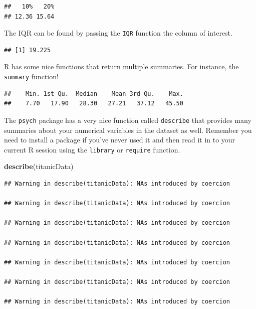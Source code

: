 \documentclass[
]{book}
\newenvironment{Shaded}{\begin{snugshade}}{\end{snugshade}}
\newcommand{\CommentTok}[1]{\textcolor[rgb]{0.56,0.35,0.01}{\textit{#1}}}
\newcommand{\KeywordTok}[1]{\textcolor[rgb]{0.13,0.29,0.53}{\textbf{#1}}}
\newcommand{\NormalTok}[1]{#1}
\newcommand{\OperatorTok}[1]{\textcolor[rgb]{0.81,0.36,0.00}{\textbf{#1}}}
\theoremstyle{definition}
\theoremstyle{definition}
\theoremstyle{definition}
\theoremstyle{remark}
\begin{document}
\begin{verbatim}
##   10%   20% 
## 12.36 15.64
\end{verbatim}

The IQR can be found by passing the \texttt{IQR} function the column of interest.

\begin{Shaded}
\end{Shaded}

\begin{verbatim}
## [1] 19.225
\end{verbatim}

R has some nice functions that return multiple summaries. For instance, the \texttt{summary} function!

\begin{Shaded}
\end{Shaded}

\begin{verbatim}
##    Min. 1st Qu.  Median    Mean 3rd Qu.    Max. 
##    7.70   17.90   28.30   27.21   37.12   45.50
\end{verbatim}

The \texttt{psych} package has a very nice function called \texttt{describe} that provides many summaries about your numerical variables in the dataset as well. Remember you need to install a package if you've never used it and then read it in to your current R session using the \texttt{library} or \texttt{require} function.

\begin{Shaded}
\begin{Highlighting}[]
\KeywordTok{describe}\NormalTok{(titanicData)}
\end{Highlighting}
\end{Shaded}

\begin{verbatim}
## Warning in describe(titanicData): NAs introduced by coercion

## Warning in describe(titanicData): NAs introduced by coercion

## Warning in describe(titanicData): NAs introduced by coercion

## Warning in describe(titanicData): NAs introduced by coercion

## Warning in describe(titanicData): NAs introduced by coercion

## Warning in describe(titanicData): NAs introduced by coercion

## Warning in describe(titanicData): NAs introduced by coercion
\end{verbatim}
\end{document}
